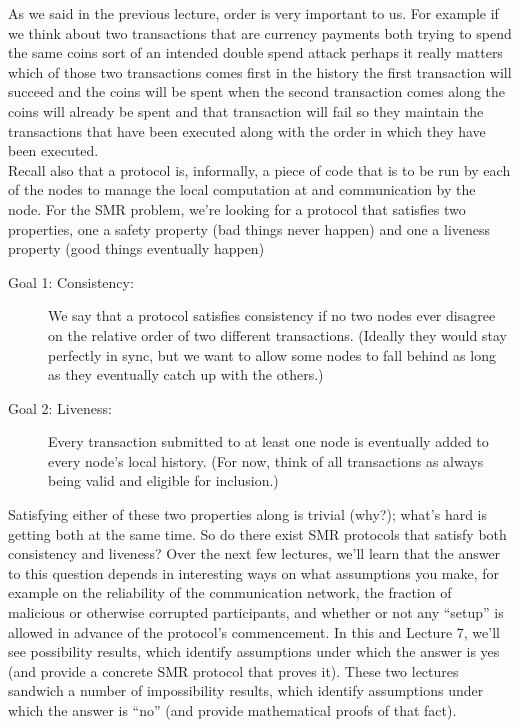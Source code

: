 As we said in the previous lecture, order is very important to us. 
For example if
we think about two transactions that are
currency payments both trying to spend
the same coins sort of an intended
double spend attack perhaps it really
matters which of those two transactions
comes first in the history the first
transaction will succeed and the coins
will be spent when the second
transaction comes along the coins will
already be spent and that transaction
will fail so they maintain the
transactions that have been executed
along with the order in which they have
been executed.\\

Recall also that a protocol is, informally, a piece of code that is to be run by each of the
nodes to manage the local computation at and communication by the node. For the SMR
problem, we’re looking for a protocol that satisfies two properties, one a safety property (bad
things never happen) and one a liveness property (good things eventually happen)\\

\begin{description}
    \item[Goal 1: Consistency:] We say that a protocol satisfies consistency if no two nodes ever
disagree on the relative order of two different transactions. (Ideally they would stay perfectly
in sync, but we want to allow some nodes to fall behind as long as they eventually catch up
with the others.)

    \item[Goal 2: Liveness:] Every transaction submitted to at least one node is eventually added
to every node’s local history. (For now, think of all transactions as always being valid and
eligible for inclusion.)
\end{description}

Satisfying either of these two properties along is trivial (why?); what’s hard is getting
both at the same time. So do there exist SMR protocols that satisfy both consistency and
liveness? Over the next few lectures, we’ll learn that the answer to this question depends
in interesting ways on what assumptions you make, for example on the reliability of the
communication network, the fraction of malicious or otherwise corrupted participants, and
whether or not any “setup” is allowed in advance of the protocol’s commencement. In
this and Lecture 7, we’ll see possibility results, which identify assumptions under which the
answer is yes (and provide a concrete SMR protocol that proves it). These two lectures
sandwich a number of impossibility results, which identify assumptions under which the
answer is “no” (and provide mathematical proofs of that fact).


